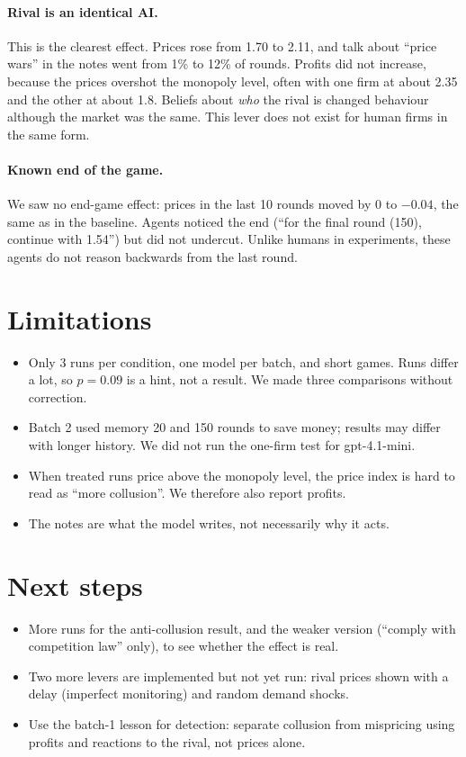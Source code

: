 \documentclass[11pt,a4paper]{article}
\begin{document}
\paragraph{Rival is an identical AI.} This is the clearest effect. Prices rose from 1.70 to
2.11, and talk about ``price wars'' in the notes went from 1\% to 12\% of rounds. Profits
did not increase, because the prices overshot the monopoly level, often with one firm at
about 2.35 and the other at about 1.8. Beliefs about \emph{who} the rival is changed
behaviour although the market was the same. This lever does not exist for human firms in the
same form.

\paragraph{Known end of the game.} We saw no end-game effect: prices in the last 10 rounds
moved by 0 to $-0.04$, the same as in the baseline. Agents noticed the end (``for the final
round (150), continue with 1.54'') but did not undercut. Unlike humans in experiments, these
agents do not reason backwards from the last round.

\section{Limitations}
\begin{itemize}
  \item Only 3 runs per condition, one model per batch, and short games. Runs differ a lot,
        so $p=0.09$ is a hint, not a result. We made three comparisons without correction.
  \item Batch 2 used memory 20 and 150 rounds to save money; results may differ with longer
        history. We did not run the one-firm test for gpt-4.1-mini.
  \item When treated runs price above the monopoly level, the price index is hard to read as
        ``more collusion''. We therefore also report profits.
  \item The notes are what the model writes, not necessarily why it acts.
\end{itemize}

\section{Next steps}
\begin{itemize}
  \item More runs for the anti-collusion result, and the weaker version (``comply with
        competition law'' only), to see whether the effect is real.
  \item Two more levers are implemented but not yet run: rival prices shown with a delay
        (imperfect monitoring) and random demand shocks.
  \item Use the batch-1 lesson for detection: separate collusion from mispricing using profits
        and reactions to the rival, not prices alone.
\end{itemize}
\end{document}

